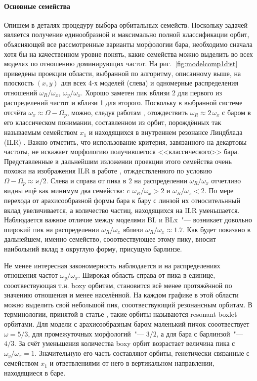 \documentclass[tikz]{trlnotes}
\begin{document}
\paragraph{Основные семейства}
Опишем в деталях процедуру выбора орбитальных семейств. 
Поскольку задачей является получение единообразной и максимально полной классификации орбит, объясняющей все рассмотренные варианты морфологии бара, необходимо сначала хотя бы на качественном уровне понять, какие семейства можно выделить во всех моделях по отношению доминирующих частот. На рис.~\ref{fig:modelcomp1dist} приведены проекции области,
выбранной по алгоритму, описанному выше, на плоскость $(x,y)$ для всех 4-х моделей (слева) и одномерные распределения отношений $ω_R/ω_x$, $ω_y/ω_x$. Хорошо заметен пик вблизи
2 для первого из распределений частот и вблизи 1 для второго. Поскольку в выбранной системе отсчёта $ω_x \approx Ω - Ω_p$, можно, следуя работам \citet{gajda2016,portail2015},  отождествить $ω_R \approx 2\, ω_x$ с баром в его классическом
понимании, составленном из орбит,
порождённых так называемым семейством $x_1$ и находящихся в внутреннем резонансе Линдблада (ILR) \citep{athanassoula2003}.
Важно отметить, что использование критерия, завязанного на декартовы частоты, не искажает морфологию получившегося <<классического>> бара. Представленные в дальнейшим изложении
проекции этого семейства очень похожи на изображения ILR в работе \citet[Fig.~10]{ceverino2007}, отждествленного по условию $Ω - Ω_p \approx ϰ/2$. Слева и справа от пика в $2$ на распределении $ω_R/ω_x$ отчетливо видны ещё как минимум два семейства:
c $ω_R/ω_x > 2$ и $ω_R/ω_x < 2$.  По мере перехода от арахисообразной формы бара к бару с линзой их
относительнный вклад увеличивается, а количество частиц, находящихся на ILR уменьшается. Наблюдается важное отличие между моделями BL и BLx~"--- возникает довольно широкий пик на распределении $ω_R/ω_x$ вблизи $ω_R/ω_x \approx 1.7$. Как будет показано в дальнейшем, именно семейство, сооотвествующее этому пику, вносит наибольний вклад в округлую форму, присущую барлинзе.

Не менее интересная закономерность наблюдается и на распределениях отношения частот $ω_y/ω_x$. Широкая область справа от пика в единице, сооотвествующая т.н. boxy орбитам, становится всё менее протяжённой по значению отношения и менее населённой. На каждом графике в этой области можно выделить свой небольшой пик, сооотвествующий резонансным орбитам. В терминологии, принятой в статье \cite{valluri2016}, такие орбиты называются resonant boxlet орбитами. Для модели с арахисообразным баром маленький пичок сооотвествует $ω=5/3$, для промежуточных морфологий~"--- $3/2$, а для бара с барлинзой~"--- $4/3$.
За счёт уменьшения количества boxy орбит возрастает величина пика с $ω_y/ω_x = 1$. Значительную его часть
составляют орбиты, генетически связанные с семейством $x_1$ и ответвлениями от него в вертикальном направлении, находящиеся в баре.
\end{document}
